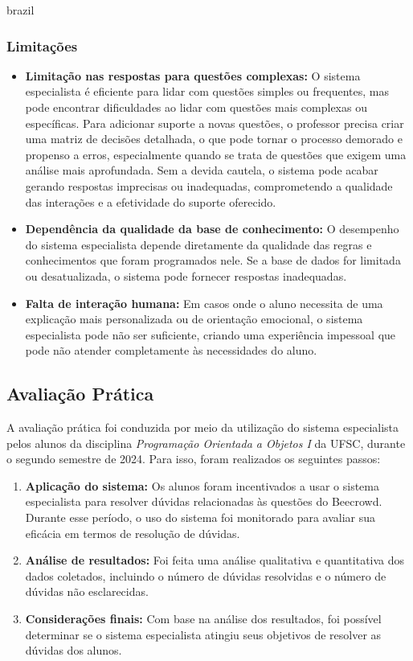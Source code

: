 \begin{otherlanguage*}{brazil}
\subsubsection{Limitações}
\begin{itemize}
	\item \textbf{Limitação nas respostas para questões complexas:} O sistema especialista é eficiente para lidar com questões simples ou frequentes, mas pode encontrar dificuldades ao lidar com questões mais complexas ou específicas. Para adicionar suporte a novas questões, o professor precisa criar uma matriz de decisões detalhada, o que pode tornar o processo demorado e propenso a erros, especialmente quando se trata de questões que exigem uma análise mais aprofundada. Sem a devida cautela, o sistema pode acabar gerando respostas imprecisas ou inadequadas, comprometendo a qualidade das interações e a efetividade do suporte oferecido.
    \item \textbf{Dependência da qualidade da base de conhecimento:} O desempenho do sistema especialista depende diretamente da qualidade das regras e conhecimentos que foram programados nele. Se a base de dados for limitada ou desatualizada, o sistema pode fornecer respostas inadequadas.
    \item \textbf{Falta de interação humana:} Em casos onde o aluno necessita de uma explicação mais personalizada ou de orientação emocional, o sistema especialista pode não ser suficiente, criando uma experiência impessoal que pode não atender completamente às necessidades do aluno.
\end{itemize}

\subsection{Avaliação Prática}

A avaliação prática foi conduzida por meio da utilização do sistema especialista pelos alunos da disciplina \textit{Programação Orientada a Objetos I} da UFSC, durante o segundo semestre de 2024. Para isso, foram realizados os seguintes passos:

\begin{enumerate}
    \item \textbf{Aplicação do sistema:} Os alunos foram incentivados a usar o sistema especialista para resolver dúvidas relacionadas às questões do Beecrowd. Durante esse período, o uso do sistema foi monitorado para avaliar sua eficácia em termos de resolução de dúvidas.
    \item \textbf{Análise de resultados:} Foi feita uma análise qualitativa e quantitativa dos dados coletados, incluindo o número de dúvidas resolvidas e o número de dúvidas não esclarecidas. 
    \item \textbf{Considerações finais:} Com base na análise dos resultados, foi possível determinar se o sistema especialista atingiu seus objetivos de resolver as dúvidas dos alunos.
\end{enumerate}


\end{otherlanguage*}
